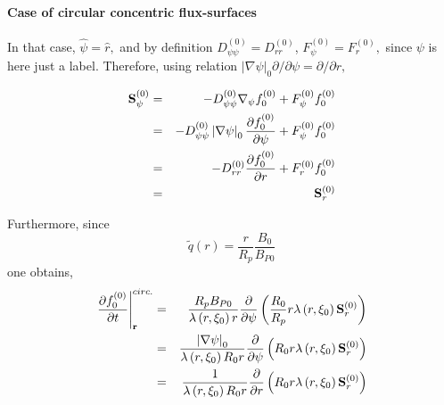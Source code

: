 \paragraph{Case of circular concentric flux-surfaces}

In that case, $\widehat{\psi }=\widehat{r},$ and by definition $D_{\psi \psi
}^{\left( 0\right) }=D_{rr}^{\left( 0\right) }$, $F_{\psi }^{\left( 0\right)
}=F_{r}^{\left( 0\right) },$ since $\psi $ is here just a label. Therefore,
using relation $\left| \nabla \psi \right| _{0}\partial /\partial \psi =%
\partial /\partial r,$

\begin{eqnarray}
\mathbf{S}_{\psi }^{\left( 0\right) } &=&-D_{\psi \psi }^{\left( 0\right)
}\nabla _{\psi }f_{0}^{\left( 0\right) }+F_{\psi }^{\left( 0\right)
}f_{0}^{\left( 0\right) }  \nonumber \\
&=&-D_{\psi \psi }^{\left( 0\right) }\left| \nabla \psi \right| _{0}\frac{%
\partial f_{0}^{\left( 0\right) }}{\partial \psi }+F_{\psi }^{\left(
0\right) }f_{0}^{\left( 0\right) }  \nonumber \\
&=&-D_{rr}^{\left( 0\right) }\frac{\partial f_{0}^{\left( 0\right) }}{%
\partial r}+F_{r}^{\left( 0\right) }f_{0}^{\left( 0\right) }  \nonumber \\
&=&\mathbf{S}_{r}^{\left( 0\right) }
\end{eqnarray}

Furthermore, since
\begin{equation}
\widetilde{q}\left( r\right) =\frac{r}{R_{p}}\frac{B_{0}}{B_{P0}}
\end{equation}
one obtains,
\begin{eqnarray}
\left. \frac{\partial f_{0}^{\left( 0\right) }}{\partial t}\right| _{\mathbf{%
r}}^{circ.} &=&\frac{R_{p}B_{P0}}{\lambda \left( r,\xi _{0}\right) r}\frac{%
\partial }{\partial \psi }\left( \frac{R_{0}}{R_{p}}r\lambda \left( r,\xi
_{0}\right) \mathbf{S}_{r}^{\left( 0\right) }\right)  \nonumber \\
&=&\frac{\left| \nabla \psi \right| _{0}}{\lambda \left( r,\xi _{0}\right)
R_{0}r}\frac{\partial }{\partial \psi }\left( R_{0}r\lambda \left( r,\xi
_{0}\right) \mathbf{S}_{r}^{\left( 0\right) }\right)  \nonumber \\
&=&\frac{1}{\lambda \left( r,\xi _{0}\right) R_{0}r}\frac{\partial }{%
\partial r}\left( R_{0}r\lambda \left( r,\xi _{0}\right) \mathbf{S}%
_{r}^{\left( 0\right) }\right)
\end{eqnarray}

